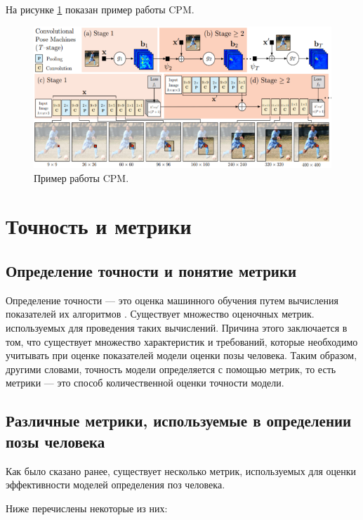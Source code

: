 На рисунке \ref{img:cpm} показан пример работы CPM.
\begin{figure}[ht!]
	\centering
	\includegraphics[width=1\linewidth]{assets/cpm.png}
	\caption{Пример работы CPM.}
	\label{img:cpm}
\end{figure}

\section{Точность и метрики}

\subsection{Определение точности и понятие метрики}

Определение точности --- это оценка машинного обучения путем вычисления показателей их алгоритмов \cite{vyugin}. 
Существует множество оценочных метрик. используемых для проведения таких вычислений.
Причина этого заключается в том, что существует множество характеристик и требований, которые необходимо учитывать при оценке показателей модели оценки позы человека.
Таким образом, другими словами, точность модели определяется с помощью метрик, то есть метрики --- это способ количественной оценки точности модели.

\subsection{Различные метрики, используемые в определении позы человека}

Как было сказано ранее, существует несколько метрик, используемых для оценки эффективности моделей определения поз человека.

Ниже перечислены некоторые из них:


